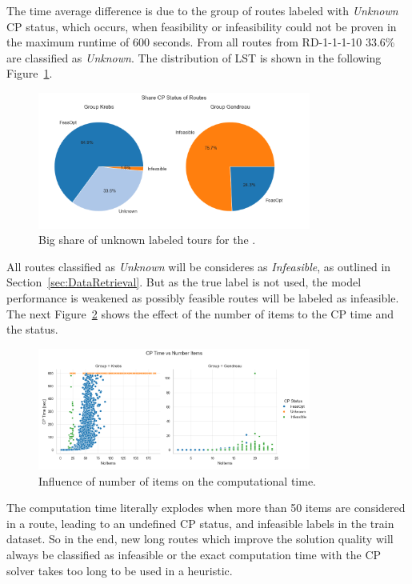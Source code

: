 The time average difference is due to the group of routes labeled with \textit{Unknown} \gls{CP} status, which occurs, when
feasibility or infeasibility could not be proven in the maximum runtime of 600 seconds. From all routes from RD-1-1-1-10
33.6\% are classified as \textit{Unknown}. The distribution of \gls{LST} is shown in the following Figure~\ref{fig:comparison_krebs_gendreau_piechart}.

\begin{figure}[ht]
    \centering
    \includegraphics[width=0.8\textwidth]{pictures/comparison_krebs_gendreau/pie_chart_share_cp_status.png}
    \caption{Big share of unknown labeled tours for the \krebsADataSet.}
    \label{fig:comparison_krebs_gendreau_piechart}
\end{figure}
All routes classified as \textit{Unknown} will be consideres as \textit{Infeasible}, as outlined in Section~\ref{sec:DataRetrieval}. But
as the true label is not used, the model performance is weakened as possibly feasible routes will be labeled as infeasible. The
next Figure~\ref{fig:comparison_krebs_gendreau_numberItems} shows the effect of the number of items to the \gls{CP} time and the status.

\begin{figure}[ht]
    \centering
    \includegraphics[width=0.8\textwidth]{pictures/comparison_krebs_gendreau/number_items_cp_status.png}
    \caption{Influence of number of items on the computational time.}
    \label{fig:comparison_krebs_gendreau_numberItems}
\end{figure}

The computation time literally explodes when more than 50 items are considered in a route, leading to an undefined \gls{CP} status, and
infeasible labels in the train dataset. So in the end, new long routes which improve the solution quality will always be classified as infeasible
or the exact computation time with the \gls{CP} solver takes too long to be used in a heuristic.
